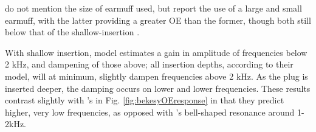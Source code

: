 {%
}
{%
}
\DIFdelend \cite{dean:00} do not mention the size of earmuff used, but \cite{stenfelt:07} report the use of a large and small earmuff, with the latter providing a greater OE than the former, though both still below that of the shallow-insertion \DIFdelbegin {}\DIFdelend \DIFaddbegin {}\DIFaddend .

With shallow insertion, \DIFdelbegin {}\DIFdelend \DIFaddbegin {}\DIFaddend model estimates a gain in amplitude of frequencies below 2 kHz, and dampening of those above; all insertion depths, according to their model, will at minimum, slightly dampen frequencies above 2 kHz.  As the plug is inserted deeper, the damping occurs on lower and lower frequencies. These results contrast slightly with \cite{bekesy:60}'s in Fig. \ref{fig:bekesyOEresponse} in that they predict higher, very low frequencies, as opposed with \cite{bekesy:60}'s bell-shaped resonance around 1-2kHz.


